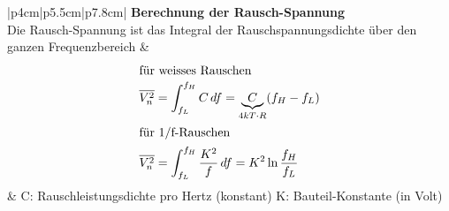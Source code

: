 \vspace{-2.5\topsep}
\begin{longtable}[t]{|p{4cm}|p{5.5cm}|p{7.8cm}|}
    \hline  
    \textbf{ Berechnung der Rausch-Spannung}
    \\ \hdashline
    Die Rausch-Spannung ist das Integral der Rauschspannungsdichte über den ganzen Frequenzbereich
    & {\vspace{-1.5\topsep}
       \begin{align*}
            \intertext{für weisses Rauschen}
            \overline{V_n^2} &= \int_{f_L}^{f_H} C \, df = \underbrace{C}_{4kT\cdot R} (f_H-f_L) \\
            \intertext{für 1/f-Rauschen}
            \overline{V_n^2} &= \int_{f_L}^{f_H} \frac{K^2}{f} \, df = K^2 \ln\frac{f_H}{f_L}
       \end{align*}
      }
    & {C: Rauschleistungsdichte pro Hertz (konstant)\newline
       \newline\newline\newline
       K: Bauteil-Konstante (in Volt)
      }
    \\ \hline
\end{longtable}


